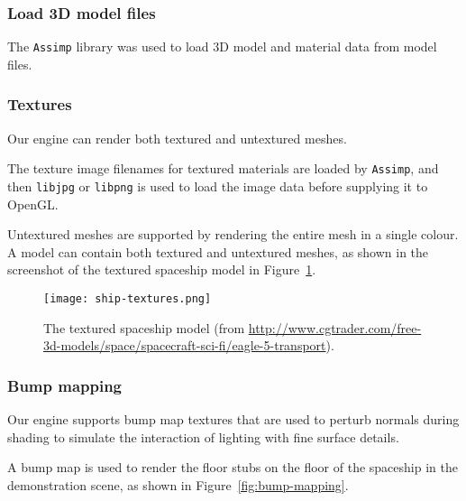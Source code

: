\documentclass[11pt]{scrartcl} %
\newcommand{\libraryname}[1]{{\texttt{#1}}}
\begin{document}
        \subsubsection{Load 3D model files}

            The \libraryname{Assimp} library was used to load 3D model and
            material data from model files.

        \subsubsection{Textures}

            Our engine can render both textured and untextured meshes.

            The texture image filenames for textured materials are loaded by
            \libraryname{Assimp}, and then \libraryname{libjpg} or
            \libraryname{libpng} is used to load the image data before
            supplying it to OpenGL.

            Untextured meshes are supported by rendering the entire mesh in a
            single colour.
            A model can contain both textured and untextured meshes, as shown in the screenshot of the textured spaceship model in Figure~\ref{fig:ship-textures}.

            \begin{figure}%
                \centering
                \texttt{[image: ship-textures.png]}
                \caption[Textured spaceship]{
                    The textured spaceship model (from
                    \url{http://www.cgtrader.com/free-3d-models/space/spacecraft-sci-fi/eagle-5-transport}).
                }
                \label{fig:ship-textures}
            \end{figure}

        \subsubsection{Bump mapping}

            Our engine supports bump map textures that are used to perturb
            normals during shading to simulate the interaction of lighting with
            fine surface details.

            A bump map is used to render the floor stubs on the floor of the
            spaceship in the demonstration scene, as shown in Figure~\ref{fig:bump-mapping}.
\end{document}
